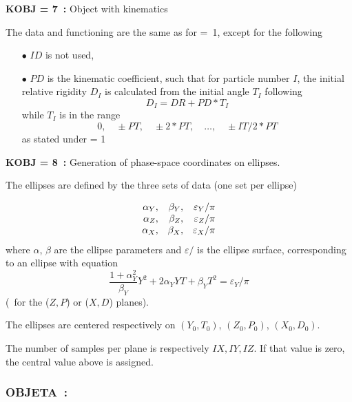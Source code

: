 \noindent\textbf{KOBJ = 7~:} Object with kinematics 

\noindent The data and functioning are the same as for \mbox{\KOBJ= 1}, except for the 
following  
\begin{itemize}
\item[$\bullet$]  $ ID $ is not used,  
\item[$\bullet$]  $ PD $ is the kinematic coefficient, such that for particle
number $ I$,  the initial relative rigidity $ D_I $ is calculated from the initial angle 
$T_I $ following
$$ D_I = DR+ PD \ast  T_I $$
 while $ T_I $ is in the range
$$ 0,\quad \pm PT,\quad \pm 2\ast PT,\quad \ldots,\quad \pm IT/2\ast PT $$
 as stated under \KOBJ = 1
\end{itemize}

\bigskip


\noindent\textbf{KOBJ = 8~:} Generation of phase-space coordinates on ellipses. 

\noindent The ellipses are defined by  the three sets of data (one set per 
  ellipse) 

$$
\begin{array}{*{2}{r<{,}}r}
 \alpha_ Y  &   \beta_ Y  
            &  \varepsilon_Y / \pi \\
\alpha_ Z   &  \beta_ Z  
            &  \varepsilon_Z / \pi \\
\alpha_ X   & \beta_ X 
            &  \varepsilon_X / \pi 
\end{array}           
$$            
%
where $\alpha$, $\beta$ are the ellipse parameters  and $\varepsilon/$ is the 
ellipse surface, corresponding to an ellipse with equation 
$$\dfrac{1 + \alpha^2_Y}{\beta_Y} Y^2 + 2 \alpha_Y YT + \beta_Y T^2 = \varepsilon_Y / \pi$$ 
\noindent (\id\ for the ($Z, P$) or ($X, D$) planes). 

\medskip

\noindent The ellipses are centered respectively on $(Y_0, T_0)$, $(Z_0, P_0)$, $(X_0, D_0)$.  

\medskip

\noindent The number of samples per plane is respectively $IX, IY, IZ$.  If that value is zero, 
the central value above is assigned. 
 

\newpage


\subsubsection*{OBJETA~:   \OBJETATitl\ \protect\cite{Biblio9}}  %
\medskip 
 \label{OBJETA} 
 

